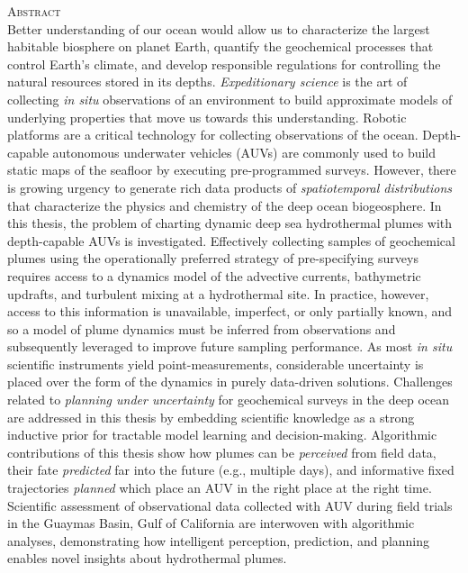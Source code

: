     \begin{singlespace}
    {\parindent0pt 
        {\large \textsc{Abstract}} \\ %

       Better understanding of our ocean would allow us to characterize the largest habitable biosphere on planet Earth, quantify the geochemical processes that control Earth's climate, and develop responsible regulations for controlling the natural resources stored in its depths. \emph{Expeditionary science} is the art of collecting \emph{in situ} observations of an environment to build approximate models of underlying properties that move us towards this understanding. Robotic platforms are a critical technology for collecting observations of the ocean. Depth-capable autonomous underwater vehicles (AUVs) are commonly used to build static maps of the seafloor by executing pre-programmed surveys. However, there is growing urgency to generate rich data products of \emph{spatiotemporal distributions} that characterize the physics and chemistry of the deep ocean biogeosphere. In this thesis, the problem of charting dynamic deep sea hydrothermal plumes with depth-capable AUVs is investigated. Effectively collecting samples of geochemical plumes using the operationally preferred strategy of pre-specifying surveys requires access to a dynamics model of the advective currents, bathymetric updrafts, and turbulent mixing at a hydrothermal site. In practice, however, access to this information is unavailable, imperfect, or only partially known, and so a model of plume dynamics must be inferred from observations and subsequently leveraged to improve future sampling performance. As most \emph{in situ} scientific instruments yield point-measurements, considerable uncertainty is placed over the form of the dynamics in purely data-driven solutions. Challenges related to \emph{planning under uncertainty} for geochemical surveys in the deep ocean are addressed in this thesis by embedding scientific knowledge as a strong inductive prior for tractable model learning and decision-making. Algorithmic contributions of this thesis show how plumes can be \emph{perceived} from field data, their fate \emph{predicted} far into the future (e.g., multiple days), and informative fixed trajectories \emph{planned} which place an AUV in the right place at the right time. Scientific assessment of observational data collected with AUV \Sentry during field trials in the Guaymas Basin, Gulf of California are interwoven with algorithmic analyses, demonstrating how intelligent perception, prediction, and planning enables novel insights about hydrothermal plumes.\\ 
       
}
\end{singlespace}
